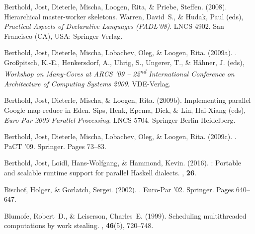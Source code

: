 \documentclass{jfp1}
\DeclareRobustCommand{\nd}{\textsuperscript{nd}\xspace}
\DeclareRobustCommand{\nd}{\textsuperscript{nd}\xspace}
\begin{document}
\begin{thebibliography}{}
Berthold, Jost, Dieterle, Mischa, Loogen, Rita, \& Priebe, Steffen. (2008).
\newblock Hierarchical master-worker skeletons.
\newblock  Warren, David~S., \& Hudak, Paul (eds), {\em Practical Aspects of
  Declarative Languages (PADL'08)}.
\newblock LNCS 4902.
\newblock San Francisco (CA), USA: Springer-Verlag.

Berthold, Jost, Dieterle, Mischa, Lobachev, Oleg, \& Loogen, Rita. (2009a).
.
 Gro\ss{}pitsch, K.-E., Henkersdorf, A.,
  Uhrig, S., Ungerer, T., \& H\"{a}hner, J. (eds), {\em Workshop on Many-Cores
  at ARCS '09 -- 22\nd International Conference on Architecture of Computing
  Systems 2009}.
\newblock VDE-Verlag.

Berthold, Jost, Dieterle, Mischa, \& Loogen, Rita. (2009b).
\newblock Implementing parallel {Google} map-reduce in {Eden}.
 Sips, Henk, Epema, Dick, \& Lin, Hai-Xiang
  (eds), {\em Euro-Par 2009 Parallel Processing}.
\newblock LNCS 5704.
\newblock Springer Berlin Heidelberg.

Berthold, Jost, Dieterle, Mischa, Lobachev, Oleg, \& Loogen, Rita. (2009c).
.
\newblock PaCT '09.
\newblock Springer.
\newblock Pages  73--83.

Berthold, Jost, Loidl, Hans-Wolfgang, \& Hammond, Kevin. (2016).
: Portable and scalable runtime support for parallel {Haskell}
  dialects.
, {\bf 26}.

Bischof, Holger, \& Gorlatch, Sergei. (2002).
.
\newblock Euro-Par '02.
\newblock Springer.
\newblock Pages  640--647.

Blumofe, Robert~D., \& Leiserson, Charles~E. (1999).
\newblock Scheduling multithreaded computations by work stealing.
, {\bf 46}(5), 720--748.


\end{thebibliography}
\end{document}
